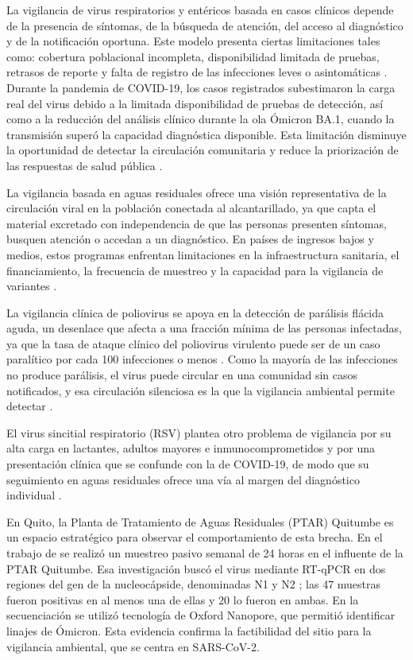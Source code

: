 La vigilancia de virus respiratorios y entéricos basada en casos clínicos depende de la presencia de síntomas, de la búsqueda de atención, del acceso al diagnóstico y de la notificación oportuna. Este modelo presenta ciertas limitaciones tales como: cobertura poblacional incompleta, disponibilidad limitada de pruebas, retrasos de reporte y falta de registro de las infecciones leves o asintomáticas \cite{Bubba_2023}. Durante la pandemia de COVID-19, los casos registrados subestimaron la carga real del virus debido a la limitada disponibilidad de pruebas de detección, así como a la reducción del análisis clínico durante la ola Ómicron BA.1, cuando la transmisión superó la capacidad diagnóstica disponible. Esta limitación disminuye la oportunidad de detectar la circulación comunitaria y reduce la priorización de las respuestas de salud pública \cite{Parkins_2023}.

La vigilancia basada en aguas residuales ofrece una visión representativa de la circulación viral en la población conectada al alcantarillado, ya que capta el material excretado con independencia de que las personas presenten síntomas, busquen atención o accedan a un diagnóstico. En países de ingresos bajos y medios, estos programas enfrentan limitaciones en la infraestructura sanitaria, el financiamiento, la frecuencia de muestreo y la capacidad para la vigilancia de variantes \cite{Parkins_2023}.

La vigilancia clínica de poliovirus se apoya en la detección de parálisis flácida aguda, un desenlace que afecta a una fracción mínima de las personas infectadas, ya que la tasa de ataque clínico del poliovirus virulento puede ser de un caso paralítico por cada 100 infecciones o menos \cite{Zurbriggen_2008}. Como la mayoría de las infecciones no produce parálisis, el virus puede circular en una comunidad sin casos notificados, y esa circulación silenciosa es la que la vigilancia ambiental permite detectar \cite{Asghar_2014}.

El virus sincitial respiratorio (RSV) plantea otro problema de vigilancia por su alta carga en lactantes, adultos mayores e inmunocomprometidos y por una presentación clínica que se confunde con la de COVID-19, de modo que su seguimiento en aguas residuales ofrece una vía al margen del diagnóstico individual \cite{Hughes_2022}.

En Quito, la Planta de Tratamiento de Aguas Residuales (PTAR) Quitumbe es un espacio estratégico para observar el comportamiento de esta brecha. En el trabajo de  se realizó un muestreo pasivo semanal de 24 horas en el influente de la PTAR Quitumbe. Esa investigación buscó el virus mediante RT-qPCR en dos regiones del gen de la nucleocápside, denominadas N1 y N2 \cite{Lu_2020}; las 47 muestras fueron positivas en al menos una de ellas y 20 lo fueron en ambas. En la secuenciación se utilizó tecnología de Oxford Nanopore, que permitió identificar linajes de Ómicron. Esta evidencia confirma la factibilidad del sitio para la vigilancia ambiental, que se centra en SARS-CoV-2.

